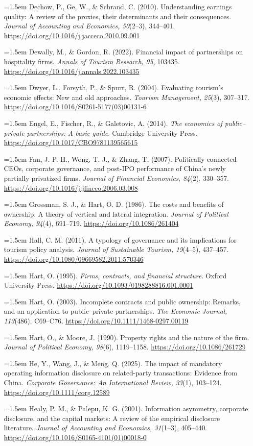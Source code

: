 \documentclass[review,3p,times]{elsarticle}
\def\refitem#1{\noindent\hangindent=1.5em\hangafter=1 #1\par\medskip}
\begin{document}
\refitem{Dechow, P., Ge, W., \& Schrand, C. (2010). Understanding earnings quality: A review of the proxies, their determinants and their consequences. \emph{Journal of Accounting and Economics, 50}(2--3), 344--401. \url{https://doi.org/10.1016/j.jacceco.2010.09.001}}
\refitem{Dewally, M., \& Gordon, R. (2022). Financial impact of partnerships on hospitality firms. \emph{Annals of Tourism Research, 95}, 103435. \url{https://doi.org/10.1016/j.annals.2022.103435}}
\refitem{Dwyer, L., Forsyth, P., \& Spurr, R. (2004). Evaluating tourism's economic effects: New and old approaches. \emph{Tourism Management, 25}(3), 307--317. \url{https://doi.org/10.1016/S0261-5177(03)00131-6}}
\refitem{Engel, E., Fischer, R., \& Galetovic, A. (2014). \emph{The economics of public--private partnerships: A basic guide}. Cambridge University Press. \url{https://doi.org/10.1017/CBO9781139565615}}
\refitem{Fan, J. P. H., Wong, T. J., \& Zhang, T. (2007). Politically connected CEOs, corporate governance, and post-IPO performance of China's newly partially privatized firms. \emph{Journal of Financial Economics, 84}(2), 330--357. \url{https://doi.org/10.1016/j.jfineco.2006.03.008}}
\refitem{Grossman, S. J., \& Hart, O. D. (1986). The costs and benefits of ownership: A theory of vertical and lateral integration. \emph{Journal of Political Economy, 94}(4), 691--719. \url{https://doi.org/10.1086/261404}}
\refitem{Hall, C. M. (2011). A typology of governance and its implications for tourism policy analysis. \emph{Journal of Sustainable Tourism, 19}(4--5), 437--457. \url{https://doi.org/10.1080/09669582.2011.570346}}
\refitem{Hart, O. (1995). \emph{Firms, contracts, and financial structure}. Oxford University Press. \url{https://doi.org/10.1093/0198288816.001.0001}}
\refitem{Hart, O. (2003). Incomplete contracts and public ownership: Remarks, and an application to public--private partnerships. \emph{The Economic Journal, 113}(486), C69--C76. \url{https://doi.org/10.1111/1468-0297.00119}}
\refitem{Hart, O., \& Moore, J. (1990). Property rights and the nature of the firm. \emph{Journal of Political Economy, 98}(6), 1119--1158. \url{https://doi.org/10.1086/261729}}
\refitem{He, Y., Wang, J., \& Meng, Q. (2025). The impact of mandatory operating information disclosure on related-party transactions: Evidence from China. \emph{Corporate Governance: An International Review, 33}(1), 103--124. \url{https://doi.org/10.1111/corg.12589}}
\refitem{Healy, P. M., \& Palepu, K. G. (2001). Information asymmetry, corporate disclosure, and the capital markets: A review of the empirical disclosure literature. \emph{Journal of Accounting and Economics, 31}(1--3), 405--440. \url{https://doi.org/10.1016/S0165-4101(01)00018-0}}
\end{document}
